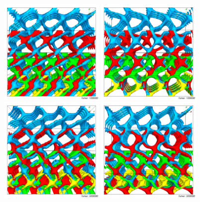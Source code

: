 \documentclass[12pt]{iopart}
\begin{document}
\begin{figure}[h]
\centering
\includegraphics[width=0.45\textwidth]{disc_bp2_t-0o5_k2o0_100k_x.png}
\includegraphics[width=0.45\textwidth]{disc_bp2_t-0o5_k2o0_100k_y.png}\\
\includegraphics[width=0.45\textwidth]{disc_bp2_t-0o5_k2o0_300k_x.png}
\includegraphics[width=0.45\textwidth]{disc_bp2_t-0o5_k2o0_300k_y.png}
\caption{}
\label{fig1}
\end{figure}
\end{document}
